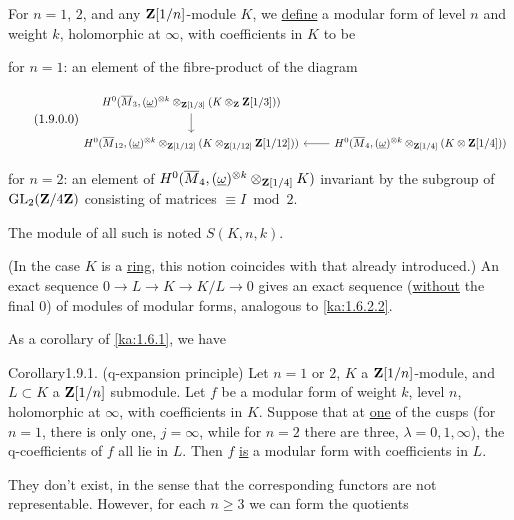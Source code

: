 
For $n=1$, $2$, and any $\mathbf{Z}[1/n]$-module $K$, we \uline{define} a modular form
of level $n$ and weight $k$, holomorphic at $\infty$, with coefficients in $K$
to be

for $n=1$: an element of the fibre-product of the diagram

\begin{equation}\tag{1.9.0.0}\label{ka:1.9.0.0}
\resizebox{\textwidth}{!}{%
\begin{tikzcd}[ampersand replacement=\&]
H^0(\Mbar_3,(\w)^{\otimes k}\tens_{\Z[1/3]}(K\tens_\Z\Z[1/3])) \arrow[d] \\
H^0(\Mbar_{12},(\w)^{\otimes k}\tens_{\Z[1/12]}(K\tens_{\Z[1/12]}\Z[1/12])) \& H^0(\Mbar_4,(\w)^{\otimes k}\tens_{\Z[1/4]}(K\tens\Z[1/4])) \arrow[l]
\end{tikzcd}}
\end{equation}

 for $n=2$: an element of
$H^0(\overline{M}_4,(\underline{\omega})^{\otimes k}\otimes_{\mathbf{Z}[1/4]}K)$ invariant by the subgroup of
$\operatorname{GL}_2(\mathbf{Z}/4\mathbf{Z})$ consisting of matrices $\equiv I\bmod 2$.

The module of all such is noted $S(K,n,k)$.

(In the case $K$ is a \uline{ring}, this notion coincides with that already
introduced.) An exact sequence $0\to L\to K\to K/L\to 0$ gives an exact sequence
(\uline{without} the final $0$) of modules of modular forms, analogous to
\eqref{ka:1.6.2.2}.

As a corollary of \eqref{ka:1.6.1}, we have

\begin{kathm}{Corollary}{1.9.1.}
(q-expansion principle) Let $n=1$ or $2$, $K$ a $\mathbf{Z}[1/n]$-module, and
$L\subset K$ a $\mathbf{Z}[1/n]$ submodule. Let $f$ be a modular form of weight $k$,
level $n$, holomorphic at $\infty$, with coefficients in $K$. Suppose that at
\uline{one} of the cusps (for $n=1$, there is only one, $j=\infty$, while for
$n=2$ there are three, $\lambda = 0,1,\infty$), the q-coefficients of $f$ all
lie in $L$. Then $f$ \uline{is} a modular form with coefficients in $L$.
\end{kathm}


They don't exist, in the sense that the corresponding functors are not
representable. However, for each $n\geq 3$ we can form the quotients

